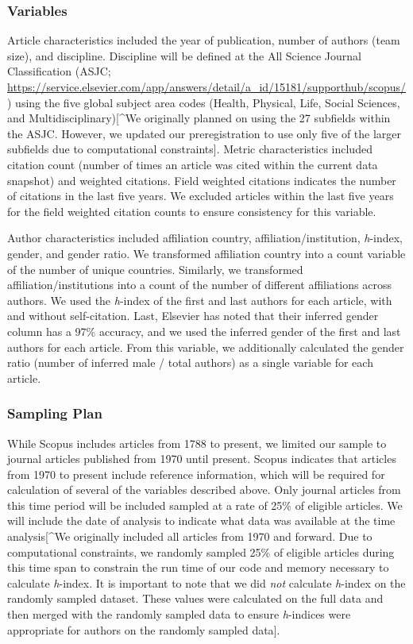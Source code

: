 \documentclass[
  man,floatsintext]{apa6}
\begin{document}
\hypertarget{variables}{%
\subsubsection{Variables}\label{variables}}

Article characteristics included the year of publication, number of authors (team size), and discipline. Discipline will be defined at the All Science Journal Classification (ASJC; \url{https://service.elsevier.com/app/answers/detail/a_id/15181/supporthub/scopus/}) using the five global subject area codes (Health, Physical, Life, Social Sciences, and Multidisciplinary){[}\^{}We originally planned on using the 27 subfields within the ASJC. However, we updated our preregistration to use only five of the larger subfields due to computational constraints{]}. Metric characteristics included citation count (number of times an article was cited within the current data snapshot) and weighted citations. Field weighted citations indicates the number of citations in the last five years. We excluded articles within the last five years for the field weighted citation counts to ensure consistency for this variable.

Author characteristics included affiliation country, affiliation/institution, \emph{h}-index, gender, and gender ratio. We transformed affiliation country into a count variable of the number of unique countries. Similarly, we transformed affiliation/institutions into a count of the number of different affiliations across authors. We used the \emph{h}-index of the first and last authors for each article, with and without self-citation. Last, Elsevier has noted that their inferred gender column has a 97\% accuracy, and we used the inferred gender of the first and last authors for each article. From this variable, we additionally calculated the gender ratio (number of inferred male / total authors) as a single variable for each article.

\hypertarget{sampling-plan}{%
\subsubsection{Sampling Plan}\label{sampling-plan}}

While Scopus includes articles from 1788 to present, we limited our sample to journal articles published from 1970 until present. Scopus indicates that articles from 1970 to present include reference information, which will be required for calculation of several of the variables described above. Only journal articles from this time period will be included sampled at a rate of 25\% of eligible articles. We will include the date of analysis to indicate what data was available at the time analysis{[}\^{}We originally included all articles from 1970 and forward. Due to computational constraints, we randomly sampled 25\% of eligible articles during this time span to constrain the run time of our code and memory necessary to calculate \emph{h}-index. It is important to note that we did \emph{not} calculate \emph{h}-index on the randomly sampled dataset. These values were calculated on the full data and then merged with the randomly sampled data to ensure \emph{h}-indices were appropriate for authors on the randomly sampled data{]}.
\end{document}
